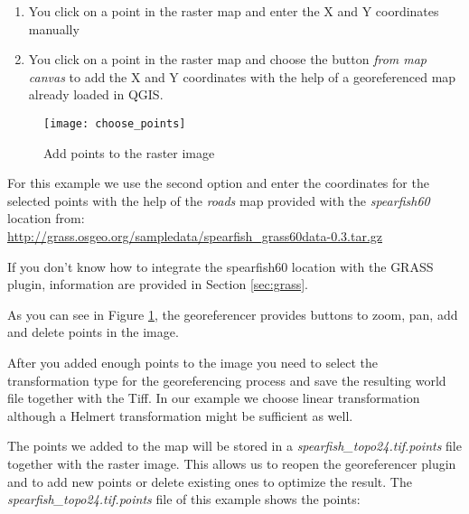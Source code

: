 \begin{enumerate}
\item You click on a point in the raster map and enter the X and Y 
coordinates manually
\item You click on a point in the raster map and choose the button
\textsl{from map canvas} to add the X and Y coordinates with the help 
of a georeferenced map already loaded in QGIS.
\end{enumerate}

\begin{figure}[ht]
\begin{center}
  \caption{Add points to the raster image}\label{fig:choose_points}\smallskip
  \texttt{[image: choose\_points]}
\end{center}
\end{figure}

For this example we use the second option and enter the coordinates for the
selected points with the help of the \textsl{roads} map provided with the 
\textsl{spearfish60} location from: \\
\url{http://grass.osgeo.org/sampledata/spearfish\_grass60data-0.3.tar.gz}

If you don't know how to integrate the spearfish60 location with the GRASS plugin, 
information are provided in Section \ref{sec:grass}.

As you can see in Figure \ref{fig:choose_points}, the georeferencer provides buttons 
to zoom, pan, add and delete points in the image.

After you added enough points to the image you need to select the transformation 
type for the georeferencing process and save the resulting world file together with 
the Tiff. In our example we choose linear transformation although a Helmert 
transformation might be sufficient as well.

\begin{Tip}\caption{\textsc{Choosing the transformation type}}
\end{Tip} 

The points we added to the map will be stored in a \textsl{spearfish\_topo24.tif.points} file together 
with the raster image. This allows us to reopen the georeferencer plugin and to add new points or delete 
existing ones to optimize the result. The \textsl{spearfish\_topo24.tif.points} file of this 
example shows the points:

